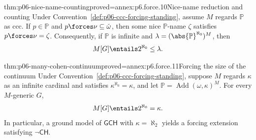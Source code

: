 \begin{hbtheorem}{thm:p06-nice-name-counting}{proved=annex:p6.force.10}{Nice-name reduction and counting}
Under Convention~\ref{def:p06-ccc-forcing-standing}, assume \(M\) regards
\(\mathbb P\) as ccc.  If \(p\in\mathbb P\) and
\(p\forces\nu\subseteq\check\omega\), then some nice
\(\mathbb P\)-name \(\zeta\) satisfies \(p\forces\nu=\zeta\).
Consequently, if \(\mathbb P\) is infinite and
\(\lambda=(\abs{\mathbb P}^{\aleph_0})^M\), then
\[
  M[G]\entails 2^{\aleph_0}\leq\lambda.
\]
\end{hbtheorem}

\begin{hbcorollary}{thm:p06-many-cohen-continuum}{proved=annex:p6.force.11}{Forcing the size of the continuum}
Under Convention~\ref{def:p06-ccc-forcing-standing}, suppose \(M\) regards
\(\kappa\) as an infinite cardinal and satisfies
\(\kappa^{\aleph_0}=\kappa\), and let
\(\mathbb P=\operatorname{Add}(\omega,\kappa)^M\).  For every
\(M\)-generic \(G\),
\[
  M[G]\entails 2^{\aleph_0}=\kappa.
\]
In particular, a ground model of \(\mathsf{GCH}\) with
\(\kappa=\aleph_2\) yields a forcing extension satisfying
\(\neg\mathsf{CH}\).
\end{hbcorollary}

